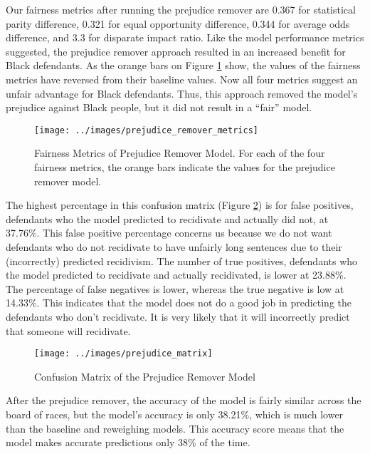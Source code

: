 \documentclass[,article,,moreauthors,pdftex]{mdpi}
\begin{document}
Our fairness metrics after running the prejudice remover are 0.367 for
statistical parity difference, 0.321 for equal opportunity difference,
0.344 for average odds difference, and 3.3 for disparate impact ratio.
Like the model performance metrics suggested, the prejudice remover
approach resulted in an increased benefit for Black defendants. As the
orange bars on Figure \ref{fig:prejudice metrics} show, the values of
the fairness metrics have reversed from their baseline values. Now all
four metrics suggest an unfair advantage for Black defendants. Thus,
this approach removed the model's prejudice against Black people, but it
did not result in a ``fair'' model.

\begin{figure}

{\centering \texttt{[image: ../images/prejudice\_remover\_metrics]} 

}

\caption{Fairness Metrics of Prejudice Remover Model. For each of the four fairness metrics, the orange bars indicate the values for the prejudice remover model.}\label{fig:prejudice metrics}
\end{figure}

The highest percentage in this confusion matrix (Figure
\ref{fig:prejudice matrix}) is for false positives, defendants who the
model predicted to recidivate and actually did not, at 37.76\%. This
false positive percentage concerns us because we do not want defendants
who do not recidivate to have unfairly long sentences due to their
(incorrectly) predicted recidivism. The number of true positives,
defendants who the model predicted to recidivate and actually
recidivated, is lower at 23.88\%. The percentage of false negatives is
lower, whereas the true negative is low at 14.33\%. This indicates that
the model does not do a good job in predicting the defendants who don't
recidivate. It is very likely that it will incorrectly predict that
someone will recidivate.

\begin{figure}

{\centering \texttt{[image: ../images/prejudice\_matrix]} 

}

\caption{Confusion Matrix of the Prejudice Remover Model}\label{fig:prejudice matrix}
\end{figure}

After the prejudice remover, the accuracy of the model is fairly similar
across the board of races, but the model's accuracy is only 38.21\%,
which is much lower than the baseline and reweighing models. This
accuracy score means that the model makes accurate predictions only 38\%
of the time.
\end{document}
